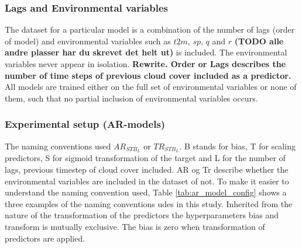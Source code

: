 \subsubsection{Lags and Environmental variables}
The dataset for a particular model is a combination of the number of lags (order of model) and environmental variables such as $t2m$, $sp$, $q$ and $r$ \textbf{(TODO alle andre plasser har du skrevet det helt ut)} is included. The environmental variables never appear in isolation.
\textbf{Rewrite. Order or Lags describes the number of time steps of previous cloud cover included as a predictor.}  All models are trained either on the full set of environmental variables or none of them, such that no partial inclusion of environmental variables occurs. 


\subsubsection{Experimental setup (AR-models)}
The naming conventions used $AR_{STB_L}$ or $TR_{STB_L}$. B stands for bias, T for scaling predictors, S for sigmoid transformation of the target and L for the number of lags, previous timestep of cloud cover included. AR og Tr describe whether the environmental variables are included in the dataset of not. %
To make it easier to understand the naming convention used, Table \ref{tab:ar_model_config} shows a three examples of the naming conventions udes in this study. %
Inherited from the nature of the transformation of the predictors the hyperparameters bias and transform is mutually exclusive. The bias is zero when transformation of predictors are applied. 

